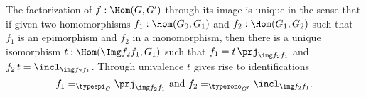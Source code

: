 \begin{construction}
The factorization of $f:\Hom(G,G')$ through its image is unique
in the sense that if given two homomorphisms $f_1:\Hom(G_0,G_1)$ and $f_2:\Hom(G_1,G_2)$ such that $f_1$ is an epimorphism and $f_2$ in a monomorphism,
then there is a unique isomorphism $t:\Hom(\Img f_2f_1,G_1)$ such that $f_1=t\,\prj_{\img f_2f_1}$ and $f_2\,t=\incl_{\img f_2f_1}$.  Through univalence $t$ gives rise to identifications
$$f_1=_{\typeepi_G}\prj_{\img f_2f_1}\text{ and }f_2=_{\typemono_{G'}}\incl_{\img f_2f_1}.$$

\end{construction}
